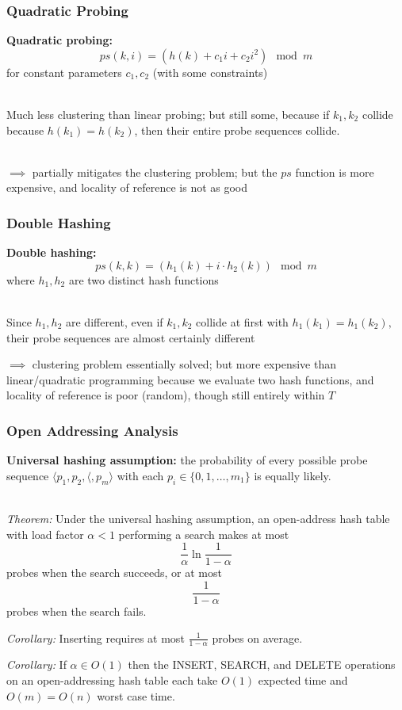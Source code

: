 \documentclass{beamer}
\newcommand{\stanza}{ \\~\ }
\begin{document}
\begin{frame} \frametitle{Quadratic Probing}
\textbf{Quadratic probing:}
\[ ps(k, i) = (h(k) + c_1 i + c_2 i^2) \mod m \]
for constant parameters $c_1, c_2$ (with some constraints)\stanza

Much less clustering than linear probing; but still some, because if $k_1, k_2$
collide because $h(k_1)=h(k_2)$, then their entire probe sequences collide. \stanza

$\implies$ partially mitigates the clustering problem; but the $ps$ function
is more expensive, and locality of reference is not as good
\end{frame}

\begin{frame} \frametitle{Double Hashing}
\textbf{Double hashing:}
\[ ps(k, k) = (h_1(k) + i \cdot h_2(k)) \mod m \]
where $h_1, h_2$ are two distinct hash functions \stanza

Since $h_1, h_2$ are different, even if $k_1,k_2$ collide at first with
$h_1(k_1)=h_1(k_2),$ their probe sequences are almost certainly different

$\implies$ clustering problem essentially solved; but more expensive than
linear/quadratic programming because we evaluate two hash functions, and
locality of reference is poor (random), though still entirely within $T$
\end{frame}

\begin{frame} \frametitle{Open Addressing Analysis}
\textbf{Universal hashing assumption:} the probability of every possible
probe sequence
$\langle p_1, p_2, \langle, p_m \rangle$
with each $p_i \in \{0, 1, \ldots, m_1 \}$
is equally likely. \stanza

\emph{Theorem:} Under the universal hashing assumption, an open-address hash
table with load factor $\alpha<1$ performing a search makes at most
\[ \frac{1}{\alpha} \ln \frac{1}{1-\alpha} \]
probes when the search succeeds, or at most
\[ \frac{1}{1-\alpha} \]
probes when the search fails.

\emph{Corollary:} Inserting requires at most $\frac{1}{1-\alpha}$ probes on average.

\emph{Corollary:} If $\alpha \in O(1)$ then the INSERT, SEARCH, and DELETE operations
on an open-addressing hash table each take $O(1)$ expected time and $O(m)=O(n)$
worst case time.
\end{frame}
\end{document}
